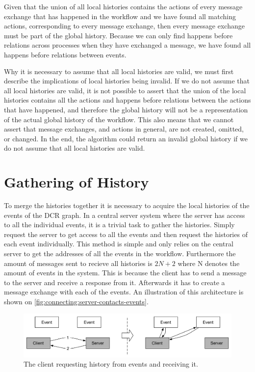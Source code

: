     \newpar Given that the union of all local histories contains the actions of every message exchange that has happened in the workflow and we have found all matching actions, corresponding to every message exchange, then every message exchange must be part of the global history. Because we can only find happens before relations across processes when they have exchanged a message, we have found all happens before relations between events.
    
    \newpar Why it is necessary to assume that all local histories are valid, we must first describe the implications of local histories being invalid. If we do not assume that all local histories are valid, it is not possible to assert that the union of the local histories contains all the actions and happens before relations between the actions that have happened, and therefore the global history will not be a representation of the actual global history of the workflow. This also means that we cannot assert that message exchanges, and actions in general, are not created, omitted, or changed. In the end, the algorithm could return an invalid global history if we do not assume that all local histories are valid.

    \section{Gathering of History}
    To merge the histories together it is necessary to acquire the local histories of the events of the DCR graph. In a central server system where the server has access to all the individual events, it is a trivial task to gather the histories. Simply request the server to get access to all the events and then request the histories of each event individually. This method is simple and only relies on the central server to get the addresses of all the events in the workflow. Furthermore the amount of messages sent to recieve all histories is $2N+2$ where N denotes the amount of events in the system. This is because the client has to send a message to the server and receive a response from it. Afterwards it has to create a message exchange with each of the events. An illustration of this architecture is shown on \autoref{fig:connecting:server-contacts-events}.
    
    \begin{figure}[H]
    	\centering
    	\includegraphics[width=\textwidth]{4connect/images/server-contacts-events.pdf}
    	\caption{The client requesting history from events and receiving it.}
    	\label{fig:connecting:server-contacts-events}
    \end{figure}
    

